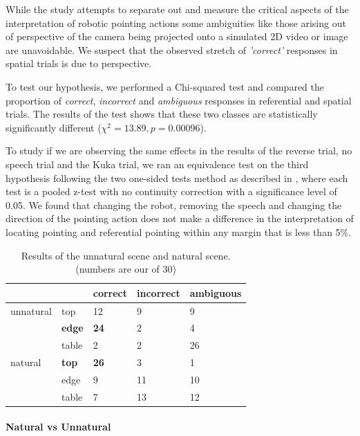 While the study attempts to separate out and measure the critical aspects of the interpretation of robotic pointing actions some ambiguities like those arising out of perspective of the camera being projected onto a simulated 2D video or image are unavoidable. We suspect that the observed stretch of \textit{'correct'} responses in spatial trials is due to perspective.

To test our hypothesis, we performed a Chi-squared test and compared the proportion of \textit{correct}, \textit{incorrect} and \textit{ambiguous} responses in referential and spatial trials. The results of the test shows that these two classes are statistically significantly different ($\chi^2= 13.89, p = 0.00096$).

To study if we are observing the same effects in the results of the reverse trial, no speech trial and the Kuka trial, we ran an equivalence test on the third hypothesis following the two one-sided tests method as described in \cite{lakens2017equivalence}, where each test is a pooled z-test with no continuity
correction with a significance level of 0.05. We found that changing the robot, removing the speech and changing the direction of the pointing action does not make a difference in the interpretation of locating pointing and referential pointing within any margin that is less than 5\%.


\begin{table}[h]
\label{tab:naturaltrial}
\begin{tabular}{lllll}
          &               & correct     & incorrect & ambiguous \\ \hline
unnatural & top           & 12          & 9         & 9         \\
          & \textbf{edge} & \textbf{24} & 2         & 4         \\
          & table         & 2           & 2         & 26        \\ \hline
natural   & \textbf{top}  & \textbf{26} & 3         & 1         \\
          & edge          & 9           & 11        & 10        \\
          & table         & 7           & 13        & 12        \\ \hline
\end{tabular}
\caption{Results of the unnatural scene and natural scene. (numbers are our of 30) }
\label{tab:natural-unnatural}
\end{table}

\paragraph{Natural vs Unnatural}

